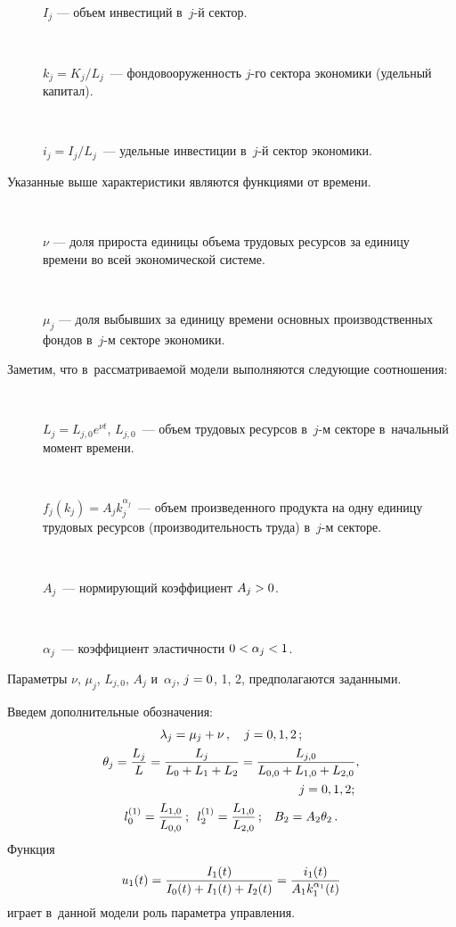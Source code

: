 \begin{multicols}{2}
\begin{description}
\item[\,] $I_j$ --- объем инвестиций в~$j$-й сектор.

\item[\,] $k_j={K_j}/{L_j}$~--- фондовооруженность $j$-го сектора
экономики (удельный капитал).

\item[\,] $i_j={I_j}/{L_j}$~--- удельные инвестиции в~$j$-й сектор
экономики.
\end{description}

Указанные выше характеристики являются функциями от времени.
\begin{description}
\item[\,] $\nu$ --- доля прироста единицы объема трудовых ресурсов за
единицу времени во всей экономической системе.

\item[\,] $\mu_j$ --- доля выбывших за единицу времени основных
производственных фондов в~$j$-м секторе экономики.
\end{description}

Заметим, что в~рассматриваемой модели выполняются следующие соотношения:
\begin{description}
\item[\,]  $L_j=L_{j,0} e^{\nu t}$, $L_{j,0}$~--- объем трудовых ресурсов 
 в~$j$-м секторе в~начальный момент времени.
\item[\,] 
$f_j(k_j)=A_j k^{\alpha_j}_j$~--- объем произведенного продукта на 
одну единицу трудовых ресурсов (производительность труда) в~$j$-м секторе.
\item[\,] 
$A_j$~---  нормирующий коэффициент $A_j \hm> 0$.
\item[\,] 
$\alpha_j$~---  коэффициент эластичности $0\hm< \alpha_j \hm< 1$.
\end{description}

Параметры $\nu$, $\mu_j$, $L_{j,0}$, $A_j$ и~$\alpha_j$, $j\hm=0$, 1, 2, 
предполагаются заданными.

Введем дополнительные обозначения:
\begin{gather*} 
\lambda_j = \mu_j + \nu\,, \quad j=0,1,2\,;
\\
\theta_j = \fr{L_j}{L}=\fr{L_j}{L_0 +L_1 +L_2}=\fr{L_{j,0}}{L_{0,0} +L_{1,0} +L_{2,0}}, 
\\
\hspace*{54mm}j=0,1,2;
\\
l^{(1)}_0 = \fr{L_{1,0}}{L_{0,0}}\,; \enskip  
l^{(1)}_2 = \fr{L_{1,0}}{L_{2,0}}\,; \enskip\ B_2=A_2 \theta_2\,.
\end{gather*}
Функция
\begin{equation*} 
u_1(t) = \displaystyle\frac{\displaystyle I_1(t)\mathstrut}{\displaystyle I_0(t)+I_1(t)+I_2(t)\mathstrut} = \displaystyle\frac{\displaystyle i_1(t)\mathstrut}{\displaystyle A_1 k^{\alpha_1}_1(t)\mathstrut}
\end{equation*}
играет в~данной модели роль параметра управ\-ления.


\end{multicols}
